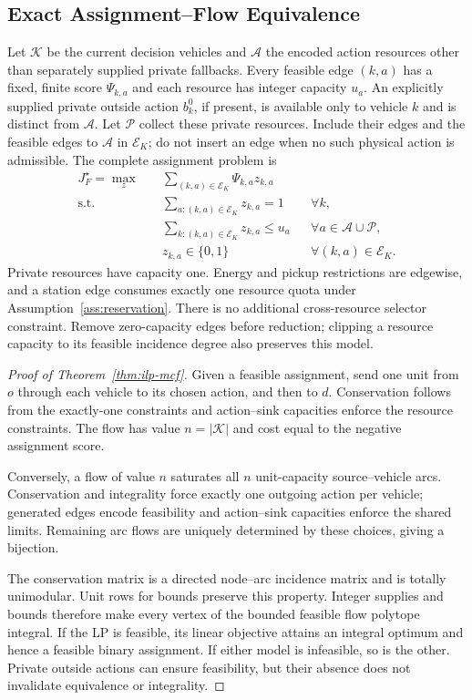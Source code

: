 \subsection{Exact Assignment--Flow Equivalence}
\label{app:proof_flow}
Let $\mathcal K$ be the current decision vehicles and $\mathcal A$ the
encoded action resources other than separately supplied private
fallbacks. Every feasible edge $(k,a)$ has a fixed,
finite score $\Psi_{k,a}$ and each resource has integer capacity $u_a$.
An explicitly supplied private outside action $b_k^0$, if present, is
available only to vehicle $k$ and is distinct from $\mathcal A$.
Let $\mathcal P$ collect these private resources. Include their edges
and the feasible edges to $\mathcal A$ in $\mathcal E_K$;
do not insert an edge when no such physical action is admissible.
The complete assignment problem is
\begin{align}
J_F^\star=\max_z\quad&\sum_{(k,a)\in\mathcal E_K}\Psi_{k,a}z_{k,a}
\label{eq:appendix_assignment_obj}\\
\text{s.t.}\quad&\sum_{a:(k,a)\in\mathcal E_K}z_{k,a}=1
&&\forall k,\label{eq:appendix_assignment_vehicle}\\
&\sum_{k:(k,a)\in\mathcal E_K}z_{k,a}\le u_a
&&\forall a\in\mathcal A\cup\mathcal P,\label{eq:appendix_assignment_capacity}\\
&z_{k,a}\in\{0,1\}&&\forall(k,a)\in\mathcal E_K.
\label{eq:appendix_assignment_binary}
\end{align}
Private resources have capacity one. Energy and pickup restrictions
are edgewise, and a station edge consumes exactly one resource quota
under Assumption~\ref{ass:reservation}. There is no additional
cross-resource selector constraint. Remove zero-capacity edges before
reduction; clipping a resource capacity to its feasible incidence
degree also preserves this model.

\begin{proof}[Proof of Theorem~\ref{thm:ilp-mcf}]
Given a feasible assignment, send one unit from $o$ through each
vehicle to its chosen action, and then to $d$. Conservation follows
from the exactly-one constraints and action--sink capacities enforce
the resource constraints. The flow has value $n=|\mathcal K|$ and
cost equal to the negative assignment score.

Conversely, a flow of value $n$ saturates all $n$ unit-capacity
source--vehicle arcs. Conservation and integrality force exactly one
outgoing action per vehicle; generated edges encode feasibility and
action--sink capacities enforce the shared limits. Remaining arc flows
are uniquely determined by these choices, giving a bijection.

The conservation matrix is a directed node--arc incidence matrix and
is totally unimodular. Unit rows for bounds preserve this property.
Integer supplies and bounds therefore make every vertex of the
bounded feasible flow polytope integral. If the LP is feasible, its
linear objective attains an integral optimum and hence a feasible
binary assignment. If either model is infeasible, so is the other.
Private outside actions can ensure feasibility, but their absence does
not invalidate equivalence or integrality.
\end{proof}

